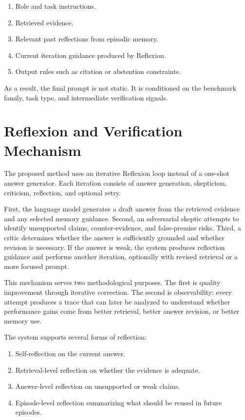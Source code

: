 \begin{enumerate}[leftmargin=*]
\item Role and task instructions.
\item Retrieved evidence.
\item Relevant past reflections from episodic memory.
\item Current iteration guidance produced by Reflexion.
\item Output rules such as citation or abstention constraints.
\end{enumerate}

As a result, the final prompt is not static. It is conditioned on the benchmark family, task type, and intermediate verification signals.

\section{Reflexion and Verification Mechanism}
\label{sec:methodology-reflexion}

The proposed method uses an iterative Reflexion loop instead of a one-shot answer generator. Each iteration consists of answer generation, skepticism, criticism, reflection, and optional retry.

First, the language model generates a draft answer from the retrieved evidence and any selected memory guidance. Second, an adversarial skeptic attempts to identify unsupported claims, counter-evidence, and false-premise risks. Third, a critic determines whether the answer is sufficiently grounded and whether revision is necessary. If the answer is weak, the system produces reflection guidance and performs another iteration, optionally with revised retrieval or a more focused prompt.

This mechanism serves two methodological purposes. The first is quality improvement through iterative correction. The second is observability: every attempt produces a trace that can later be analyzed to understand whether performance gains come from better retrieval, better answer revision, or better memory use.

The system supports several forms of reflection:

\begin{enumerate}[leftmargin=*]
\item Self-reflection on the current answer.
\item Retrieval-level reflection on whether the evidence is adequate.
\item Answer-level reflection on unsupported or weak claims.
\item Episode-level reflection summarizing what should be reused in future episodes.
\end{enumerate}

